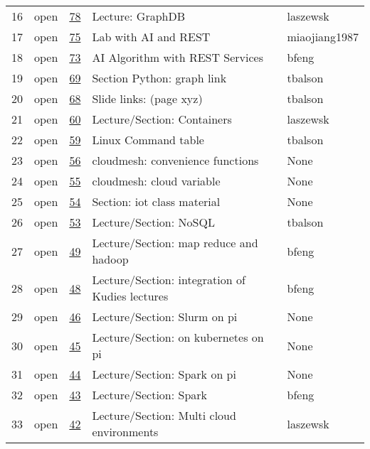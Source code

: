 \begin{center}
\begin{longtable}{lllll}
16 & open & \href{https://github.com/cloudmesh/book/issues/78}{78} & Lecture: GraphDB & laszewsk\\
17 & open & \href{https://github.com/cloudmesh/book/issues/75}{75} & Lab with AI and REST & miaojiang1987\\
18 & open & \href{https://github.com/cloudmesh/book/issues/73}{73} & AI Algorithm with REST Services & bfeng\\
19 & open & \href{https://github.com/cloudmesh/book/issues/69}{69} & Section Python: graph link & tbalson\\
20 & open & \href{https://github.com/cloudmesh/book/issues/68}{68} & Slide links: (page xyz) & tbalson\\
21 & open & \href{https://github.com/cloudmesh/book/issues/60}{60} & Lecture/Section: Containers & laszewsk\\
22 & open & \href{https://github.com/cloudmesh/book/issues/59}{59} & Linux Command table & tbalson\\
23 & open & \href{https://github.com/cloudmesh/book/issues/56}{56} & cloudmesh: convenience functions & None\\
24 & open & \href{https://github.com/cloudmesh/book/issues/55}{55} & cloudmesh: cloud variable & None\\
25 & open & \href{https://github.com/cloudmesh/book/issues/54}{54} & Section: iot class material & None\\
26 & open & \href{https://github.com/cloudmesh/book/issues/53}{53} & Lecture/Section: NoSQL & tbalson\\
27 & open & \href{https://github.com/cloudmesh/book/issues/49}{49} & Lecture/Section: map reduce and hadoop & bfeng\\
28 & open & \href{https://github.com/cloudmesh/book/issues/48}{48} & Lecture/Section: integration of Kudies lectures & bfeng\\
29 & open & \href{https://github.com/cloudmesh/book/issues/46}{46} & Lecture/Section: Slurm on pi & None\\
30 & open & \href{https://github.com/cloudmesh/book/issues/45}{45} & Lecture/Section: on kubernetes on pi & None\\
31 & open & \href{https://github.com/cloudmesh/book/issues/44}{44} & Lecture/Section: Spark on pi & None\\
32 & open & \href{https://github.com/cloudmesh/book/issues/43}{43} & Lecture/Section: Spark & bfeng\\
33 & open & \href{https://github.com/cloudmesh/book/issues/42}{42} & Lecture/Section: Multi cloud environments & laszewsk\\

\end{longtable}
\end{center}
